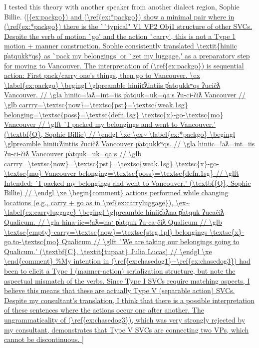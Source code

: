 I tested this theory with another speaker from another dialect region, Sophie Billie. (\ref{{ex:packgo}) and (\ref{ex:*packgo}) show a minimal pair where in (\ref{ex:*packgo}) there is the ``typical" V1 VP2 Obj1 structure of other SVCs. Despite the verb of motion `go' and the action `carry', this is not a Type 1 motion + manner construction. Sophie consistently translated \textit{hiniic p̓atqukkʷqs} as `pack my belongings' or `get my luggage,' as a preparatory step for moving to Vancouver. The interpretation of (\ref{ex:packgo}) is sequential action: First pack/carry one's things, then go to Vancouver.

\ex \label{ex:packgo}
\begingl
\glpreamble hiniic̓ƛintiis p̓atqukkʷqs ʔucičƛ Vancouver. //
\gla hiniic=!aƛ=int=iis p̓atquk=uk=qaˑs ʔu-ci-čiƛ Vancouver //
\glb carrry=\textsc{now}=\textsc{pst}=\textsc{weak.1sg} belonging=\textsc{poss}=\textsc{defn.1sg} \textsc{x}-go-\textsc{mo} Vancouver //
\glft `I packed my belongings and went to Vancouver.' (\textbf{Q}, Sophie Billie) //
\endgl
\xe

\ex~ \label{ex:*packgo}
\begingl
\glpreamble hiniic̓ƛintiis ʔucičƛ Vancouver p̓atqukkʷqs. //
\gla hiniic=!aƛ=int=iis ʔu-ci-čiƛ Vancouver p̓atquk=uk=qaˑs //
\glb carrry=\textsc{now}=\textsc{pst}=\textsc{weak.1sg} \textsc{x}-go-\textsc{mo} Vancouver belonging=\textsc{poss}=\textsc{defn.1sg} //
\glft Intended: `I packed my belongings and went to Vancouver.' (\textbf{Q}, Sophie Billie) //
\endgl
\xe


\begin{comment}
actions performed while changing locations (e.g., carry + go as in \ref{ex:carryluggage}),

\ex~ \label{ex:carryluggage}
\begingl
\glpreamble hiniic̓aƛna p̓atquk ʔucačiƛ Qualicum. //
\gla hina-iic=!aƛ=naˑ p̓atquk ʔu-ca-čiƛ Qualicum //
\glb \textsc{empty}-carry=\textsc{now}=\textsc{strg.1pl} belongings \textsc{x}-go.to-\textsc{mo} Qualicum //
\glft `We are taking our belongings going to Qualicum.' (\textbf{C}, \textit{tupaat} Julia Lucas) //
\endgl
\xe 
\end{comment}


}
